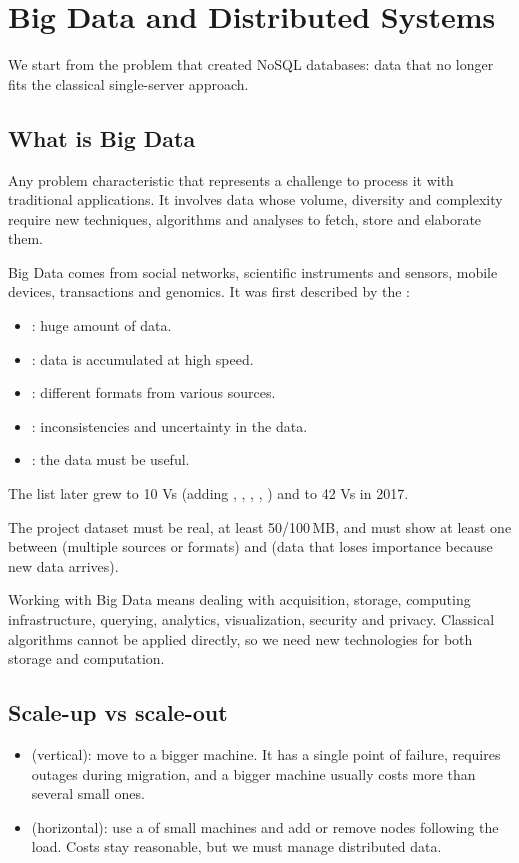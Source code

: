 \section{Big Data and Distributed Systems}

We start from the problem that created NoSQL databases: data that no longer fits the classical single-server approach.

\subsection{What is Big Data}
\begin{definition}
Any problem characteristic that represents a challenge to process it with traditional applications. It involves data whose volume, diversity and complexity require new techniques, algorithms and analyses to fetch, store and elaborate them.
\end{definition}

Big Data comes from social networks, scientific instruments and sensors, mobile devices, transactions and genomics. It was first described by the :
\begin{itemize}
  \item {}: huge amount of data.
  \item {}: data is accumulated at high speed.
  \item {}: different formats from various sources.
  \item {}: inconsistencies and uncertainty in the data.
  \item {}: the data must be useful.
\end{itemize}
The list later grew to 10 Vs (adding , , , , ) and to 42 Vs in 2017.

\begin{remark}
The project dataset must be real, at least 50/100\,MB, and must show at least one between  (multiple sources or formats) and  (data that loses importance because new data arrives).
\end{remark}

Working with Big Data means dealing with acquisition, storage, computing infrastructure, querying, analytics, visualization, security and privacy. Classical algorithms cannot be applied directly, so we need new technologies for both storage and computation.

\subsection{Scale-up vs scale-out}
\begin{itemize}
  \item {} (vertical): move to a bigger machine. It has a single point of failure, requires outages during migration, and a bigger machine usually costs more than several small ones.
  \item {} (horizontal): use a  of small machines and add or remove nodes following the load. Costs stay reasonable, but we must manage distributed data.
\end{itemize}

